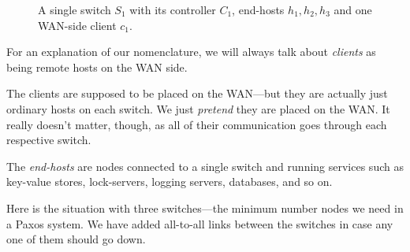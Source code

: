 \begin{figure}[H]
  \centering
  \caption{A single switch $S_1$ with its controller $C_1$, end-hosts
    $h_1, h_2, h_3$ and one WAN-side client $c_1$.}
  \label{figure:graph.single.switch}
\end{figure}

For an explanation of our nomenclature, we will always
talk about \textit{clients} as being remote hosts on the \ac{WAN} side.

The clients are supposed to be placed on the \ac{WAN}---but they are actually
just ordinary hosts on each switch.  We just \textit{pretend} they are
placed on the \acs{WAN}.  It really doesn't matter, though, as all of their
communication goes through each respective switch.

The \textit{end-hosts} are nodes connected to a single
switch and running services such as key-value stores,
lock-servers, logging servers,
databases, and so on.

Here is the situation with three switches---the minimum number nodes we need
in a Paxos system.  We have added all-to-all links between the switches in
case any one of them should go down.

